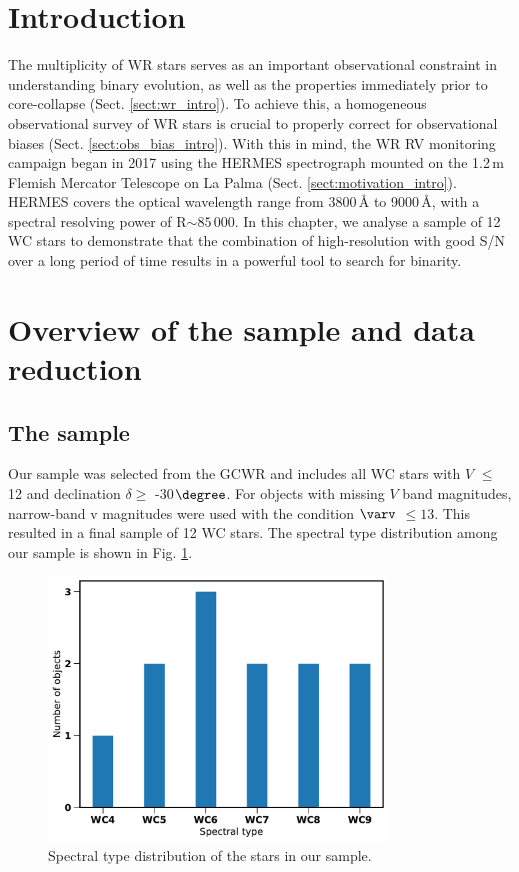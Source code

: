 \section{Introduction}
The multiplicity of WR stars serves as an important observational constraint in understanding binary evolution, as well as the properties immediately prior to core-collapse (Sect. \ref{sect:wr_intro}). To achieve this, a homogeneous observational survey of WR stars is crucial to properly correct for observational biases (Sect. \ref{sect:obs_bias_intro}). With this in mind, the WR RV monitoring campaign began in 2017 using the HERMES spectrograph mounted on the 1.2\,m Flemish Mercator Telescope on La Palma (Sect. \ref{sect:motivation_intro}). HERMES covers the optical wavelength range from 3800\,\r{A} to 9000\,\r{A}, with a spectral resolving power of R${\sim}85\,000$. In this chapter, we analyse a sample of 12 WC stars to demonstrate that the combination of high-resolution with good S/N over a long period of time results in a powerful tool to search for binarity.

\section{Overview of the sample and data reduction} \label{sect:sample}
\subsection{The sample}
Our sample was selected from the GCWR and includes all WC stars with $V$ $\leq$ 12 and declination $\delta \ge$ -30$\degree$. For objects with missing $V$ band magnitudes, narrow-band v magnitudes \citep{smith_absolute_1968,massey_absolute_1984} were used with the condition $\varv$ $\leq 13$. This resulted in a final sample of 12 WC stars. The spectral type distribution among our sample is shown in Fig. \ref{fig:target_dist}.
\begin{figure}
    \centering
    \includegraphics[width=9cm]{chapters/WC/image/target_dist.pdf}
    \caption{Spectral type distribution of the stars in our sample.}
    \label{fig:target_dist}
\end{figure}
